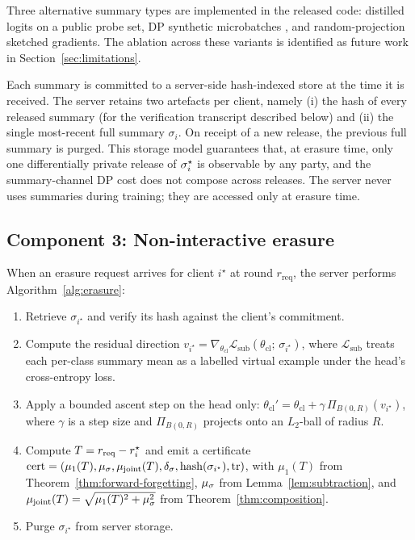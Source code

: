 Three alternative summary types are implemented in the released code: distilled logits
on a public probe set, DP synthetic microbatches \cite{harder2021dpmerf}, and
random-projection sketched gradients. The ablation across these variants is identified
as future work in Section~\ref{sec:limitations}.

Each summary is committed to a server-side hash-indexed store at the time it is
received. The server retains two artefacts per client, namely (i) the hash of every
released summary (for the verification transcript described below) and (ii) the single
most-recent full summary $\sigma_i$. On receipt of a new release, the previous full
summary is purged. This storage model guarantees that, at erasure time, only one
differentially private release of $\sigma_i^{\star}$ is observable by any party, and the
summary-channel DP cost does not compose across releases. The server never uses
summaries during training; they are accessed only at erasure time.

\subsection{Component 3: Non-interactive erasure}
\label{sec:method-erasure}

When an erasure request arrives for client $i^\star$ at round
$r_\mathrm{req}$, the server performs Algorithm~\ref{alg:erasure}:

\begin{enumerate}[leftmargin=*,itemsep=1pt]
\item Retrieve $\sigma_{i^\star}$ and verify its hash against the client's commitment.
\item Compute the residual direction $v_{i^\star} = \nabla_{\theta_\mathrm{cl}} \mathcal{L}_\mathrm{sub}(\theta_\mathrm{cl};\, \sigma_{i^\star})$, where $\mathcal{L}_\mathrm{sub}$ treats each per-class summary mean as a labelled virtual example under the head's cross-entropy loss.
\item Apply a bounded ascent step on the head only: $\theta_\mathrm{cl}' = \theta_\mathrm{cl} + \gamma\, \Pi_{B(0, R)}(v_{i^\star})$, where $\gamma$ is a step size and $\Pi_{B(0, R)}$ projects onto an $L_2$-ball of radius $R$.
\item Compute $T = r_\mathrm{req} - r_i^{\star}$ and emit a certificate $\mathrm{cert} = (\mu_1(T), \mu_\sigma, \mu_\mathrm{joint}(T), \delta_\sigma, \mathrm{hash}(\sigma_{i^\star}), \mathrm{tr})$, with $\mu_1(T)$ from Theorem~\ref{thm:forward-forgetting}, $\mu_\sigma$ from Lemma~\ref{lem:subtraction}, and $\mu_\mathrm{joint}(T) = \sqrt{\mu_1(T)^2 + \mu_\sigma^2}$ from Theorem~\ref{thm:composition}.
\item Purge $\sigma_{i^\star}$ from server storage.
\end{enumerate}

